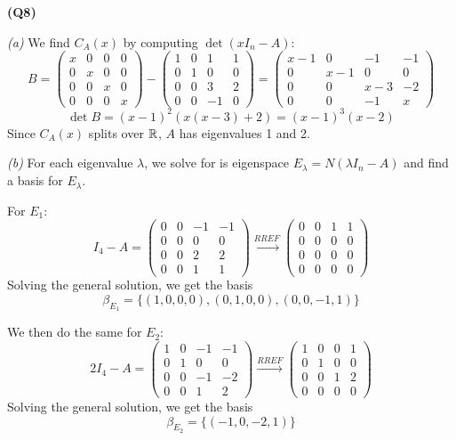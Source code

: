 \documentclass[12pt, a4paper]{article}
\begin{document}
\textbf{(Q8)}

\textit{(a)} We find $C_A(x)$ by computing $\det(xI_n - A)$:
\[
    B = \begin{pmatrix}
        x & 0 & 0 & 0\\
        0 & x & 0 & 0\\
        0 & 0 & x & 0\\
        0 & 0 & 0 & x
    \end{pmatrix} -
    \begin{pmatrix}
        1 & 0 & 1 & 1\\
        0 & 1 & 0 & 0\\
        0 & 0 & 3 & 2\\
        0 & 0 &-1 & 0
    \end{pmatrix} =
    \begin{pmatrix}
        x-1 & 0 &-1 &-1\\
        0 & x-1 & 0 & 0\\
        0 & 0 & x-3 &-2\\
        0 & 0 & -1 & x
    \end{pmatrix}
\]
\[
    \det B = (x - 1)^2\left(x(x-3) + 2\right)
    =(x - 1)^3(x - 2)
\]
Since $C_A(x)$ splits over $\mathbb{R}$, $A$ has eigenvalues 1 and 2.

\textit{(b)} For each eigenvalue $\lambda$, we solve for is eigenspace
$E_\lambda = N(\lambda I_n - A)$ and find a basis for $E_\lambda$.

For $E_1$:
\[
    I_4 - A = \begin{pmatrix}
        0 & 0 & -1 & -1\\
        0 & 0 & 0 & 0\\
        0 & 0 & 2 & 2\\
        0 & 0 & 1 & 1
    \end{pmatrix} \xrightarrow{RREF}
    \begin{pmatrix}
        0 & 0 & 1 & 1\\
        0 & 0 & 0 & 0\\
        0 & 0 & 0 & 0\\
        0 & 0 & 0 & 0
    \end{pmatrix}
\]
Solving the general solution, we get the basis
\[
    \beta_{E_1} = \{
        (1, 0, 0, 0),
        (0, 1, 0, 0),
        (0, 0, -1, 1)
    \}
\]

We then do the same for $E_2$:
\[
    2I_4 - A = \begin{pmatrix}
        1 & 0 & -1 & -1\\
        0 & 1 & 0 & 0\\
        0 & 0 & -1 & -2\\
        0 & 0 & 1 & 2
    \end{pmatrix} \xrightarrow{RREF}
    \begin{pmatrix}
        1 & 0 & 0 & 1\\
        0 & 1 & 0 & 0\\
        0 & 0 & 1 & 2\\
        0 & 0 & 0 & 0
    \end{pmatrix}
\]
Solving the general solution, we get the basis
\[
    \beta_{E_2} = \{
        (-1, 0, -2, 1)
    \}
\]
\end{document}

